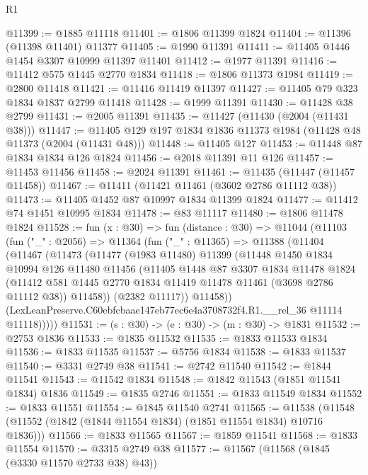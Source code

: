 \begin{lexlean}{R1}
\begin{coremodule}
@11399 := @1885 @11118
@11401 := @1806 @11399 @1824
@11404 := @11396 (@11398 @11401) @11377
@11405 := @1990 @11391
@11411 := @11405 @1446 @1454 @3307 @10999 @11397 @11401
@11412 := @1977 @11391
@11416 := @11412 @575 @1445 @2770 @1834
@11418 := @1806 @11373 @1984
@11419 := @2800 @11418
@11421 := @11416 @11419 @11397
@11427 := @11405 @79 @323 @1834 @1837 @2799 @11418
@11428 := @1999 @11391
@11430 := @11428 @38 @2799
@11431 := @2005 @11391
@11435 := @11427 (@11430 (@2004 (@11431 @38)))
@11447 := @11405 @129 @197 @1834 @1836 @11373 @1984 (@11428 @48 @11373 (@2004 (@11431 @48)))
@11448 := @11405 @127
@11453 := @11448 @87 @1834 @1834 @126 @1824
@11456 := @2018 @11391 @11 @126
@11457 := @11453 @11456
@11458 := @2024 @11391
@11461 := @11435 (@11447 (@11457 @11458))
@11467 := @11411 (@11421 @11461 (@3602 @2786 @11112 @38))
@11473 := @11405 @1452 @87 @10997 @1834 @11399 @1824
@11477 := @11412 @74 @1451 @10995 @1834
@11478 := @83 @11117
@11480 := @1806 @11478 @1824
@11528 := fun (x : @30) =>
  fun (distance : @30) =>
  @11044
    (@11103
      (fun ("_" : @2056) =>
      @11364
        (fun ("_" : @11365) =>
        @11388
          (@11404
            (@11467
              (@11473
                (@11477
                  (@1983 @11480)
                  @11399
                  (@11448
                    @1450
                    @1834
                    @10994
                    @126
                    @11480
                    @11456
                    (@11405
                      @1448
                      @87
                      @3307
                      @1834
                      @11478
                      @1824
                      (@11412 @581 @1445 @2770 @1834 @11419 @11478 @11461 (@3698 @2786 @11112 @38))
                      @11458))
                  (@2382 @11117))
                @11458))
            (LexLeanPreserve.C60ebfcbaae147eb77ec6e4a3708732f4.R1.__rel_36 @11114 @11118)))))
@11531 := (s : @30) -> (e : @30) -> (m : @30) -> @1831
@11532 := @2753 @1836
@11533 := @1835 @11532
@11535 := @1833 @11533 @1834
@11536 := @1833 @11535
@11537 := @5756 @1834
@11538 := @1833 @11537
@11540 := @3331 @2749 @38
@11541 := @2742 @11540
@11542 := @1844 @11541
@11543 := @11542 @1834
@11548 := @1842 @11543 (@1851 @11541 @1834) @1836
@11549 := @1835 @2746
@11551 := @1833 @11549 @1834
@11552 := @1833 @11551
@11554 := @1845 @11540 @2741
@11565 := @11538 (@11548 (@11552 (@1842 (@1844 @11554 @1834) (@1851 @11554 @1834) @10716 @1836)))
@11566 := @1833 @11565
@11567 := @1859 @11541
@11568 := @1833 @11554
@11570 := @3315 @2749 @38
@11577 := @11567 (@11568 (@1845 (@3330 @11570 @2733 @38) @43))

\end{coremodule}
\end{lexlean}
